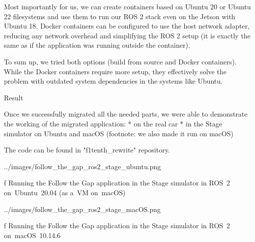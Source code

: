 Most importantly for us, we can create containers based on Ubuntu 20 or Ubuntu 22 filesystems and use them to run our ROS 2 stack even on the Jetson with Ubuntu 18. Docker containers can be configured to use the host network adapter, reducing any network overhead and simplifying the ROS 2 setup (it is exactly the same as if the application was running outside the container).

To sum up, we tried both options (build from source and Docker containers). While the Docker containers require more setup, they effectively solve the problem with outdated system dependencies in the systems like Ubuntu.


\sec Result

Once we successfully migrated all the needed parts, we were able to demonstrate the working of the migrated application:
\begitems
* on the real car
* in the Stage simulator on Ubuntu and macOS (footnote: we also made it run on macOS)
\enditems

The code can be found in "f1tenth_rewrite" repository.

\midinsert
{}
\picw=14cm \cinspic ../images/follow_the_gap_ros2_stage_ubuntu.png
\caption/f Running the Follow the Gap application in the Stage simulator in ROS~2 on~Ubuntu~20.04 (as a~VM on~macOS)
\endinsert

\midinsert
{}
\picw=14cm \cinspic ../images/follow_the_gap_ros2_stage_macOS.png
\caption/f Running the Follow the Gap application in the Stage simulator in ROS~2 \hbox{on~macOS~10.14.6}
\endinsert
